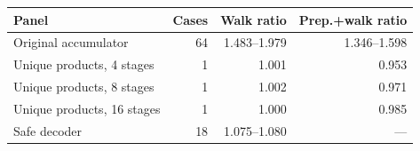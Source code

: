 \begin{tabular}{lrrr}
\toprule
Panel & Cases & Walk ratio & Prep.+walk ratio \\
\midrule
Original accumulator & 64 & 1.483--1.979 & 1.346--1.598 \\
Unique products, 4 stages & 1 & 1.001 & 0.953 \\
Unique products, 8 stages & 1 & 1.002 & 0.971 \\
Unique products, 16 stages & 1 & 1.000 & 0.985 \\
Safe decoder & 18 & 1.075--1.080 & --- \\
\bottomrule
\end{tabular}

